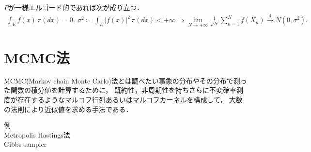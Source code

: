 	\begin{prp}[中心極限定理]
		$P$が一様エルゴード的であれば次が成り立つ．
		\begin{align}
			\int_E f(x)\, \pi(dx) = 0,\ \sigma^2 \coloneqq \int_E |f(x)|^2\, \pi(dx) < +\infty 
			\Rightarrow \lim_{N \to +\infty} \frac{1}{\sqrt{N}} \sum_{n=1}^{N} f(X_n) \overset{\mathrm{d}}{\rightarrow} N(0,\sigma^2).
		\end{align}
	\end{prp}
	
\section{MCMC法}
	MCMC(Markov chain Monte Carlo)法とは調べたい事象の分布やその分布で測った関数の積分値を計算するために，
	既約性，非周期性を持ちさらに不変確率測度が存在するようなマルコフ行列あるいはマルコフカーネルを構成して，
	大数の法則により近似値を求める手法である．
	
	\begin{description}
		\item[例]
		\item[Metropolis Hastings法]
		\item[Gibbs sampler]
	\end{description}
	